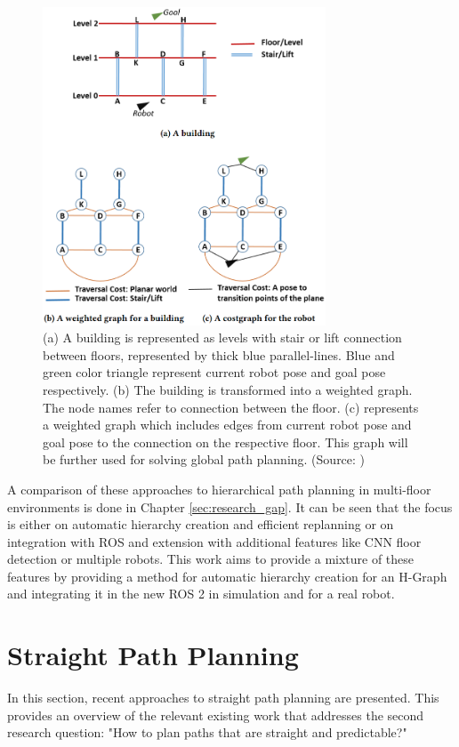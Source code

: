 \begin{figure}[h]
    \centering
    \includegraphics[width=0.75\textwidth]{figures/20_state_of_the_art/dihman_cost_graph.png}
    \caption[The cost graph for the robot]{(a) A building is represented as levels with stair or lift connection between floors, represented by thick blue parallel-lines. Blue and green color triangle represent current robot pose and goal pose respectively. (b) The building is transformed into a weighted graph. The node names refer to connection between the floor. (c) represents a weighted graph which includes edges from current robot pose and goal pose to the connection on the respective floor. This graph will be further used for solving global path planning. (Source: \cite{dhiman_ros_2020})}
    \label{fig:dihman_cost_graph}
\end{figure}

A comparison of these approaches to hierarchical path planning in multi-floor environments is done in Chapter \ref{sec:research_gap}. It can be seen that the focus is either on automatic hierarchy creation and efficient replanning or on integration with ROS and extension with additional features like CNN floor detection or multiple robots. This work aims to provide a mixture of these features by providing a method for automatic hierarchy creation for an H-Graph and integrating it in the new ROS 2 in simulation and for a real robot.

\section{Straight Path Planning}
\label{sec:straight_paths}
In this section, recent approaches to straight path planning are presented. This provides an overview of the relevant existing work that addresses the second research question: "How to plan paths that are straight and predictable?"

